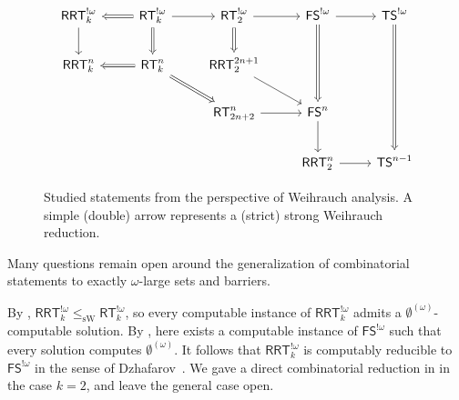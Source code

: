 \documentclass{article}
\newcommand{\RCA}[0]{\mathsf{RCA}}
\newcommand{\RRT}[0]{\mathsf{RRT}}
\newcommand{\FS}[0]{\mathsf{FS}}
\newcommand{\TS}[0]{\mathsf{TS}}
\newcommand{\RT}[0]{\mathsf{RT}}
\newcommand{\sW}{\mathrm{sW}}
\numberwithin{theorem}{section}
\begin{document}



\begin{figure}
\centering
\[\begin{tikzcd}[row sep=2em,column sep=2.5em]
\RRT^{!\omega}_k  \arrow[d] & \arrow[l, Rightarrow] \RT^{!\omega}_k \arrow[d, Rightarrow] \arrow[r] &  \RT^{!\omega}_2  \arrow[d, Rightarrow] \arrow[r] &  \FS^{!\omega}  \arrow[dd, Rightarrow] \arrow[r] & \TS^{!\omega} \arrow[ddd, Rightarrow] \\
\RRT^n_k & \arrow[l, Rightarrow] \RT^n_k  \arrow[dr, Rightarrow]   & \RRT^{2n+1}_2 \arrow[dr]  &    &  \\
&   & \RT^n_{2n+2}  \arrow[r] & \FS^n \arrow[d]  &   \\
 & & &\RRT^{n}_2 \arrow[r]  & \TS^{n-1}
\end{tikzcd}\]
\caption{Studied statements from the perspective of Weihrauch analysis. A simple (double) arrow represents a (strict) strong Weihrauch reduction.}\label{fig:reductions}
\end{figure}


Many questions remain open around the generalization of combinatorial statements to exactly $\omega$-large sets and barriers.


By , $\RRT^{!\omega}_k \leq_\sW \RT^{!\omega}_k$, so every computable instance of $\RRT^{!\omega}_k$ admits a $\emptyset^{(\omega)}$-computable solution. By , here exists a computable instance of $\FS^{!\omega}$ such that every solution computes $\emptyset^{(\omega)}$. It follows that $\RRT^{!\omega}_k$ is computably reducible to $\FS^{!\omega}$ in the sense of Dzhafarov~\cite{dzhafarov2016strong}. We gave a direct combinatorial reduction in  in the case $k = 2$, and leave the general case open.
\end{document}
